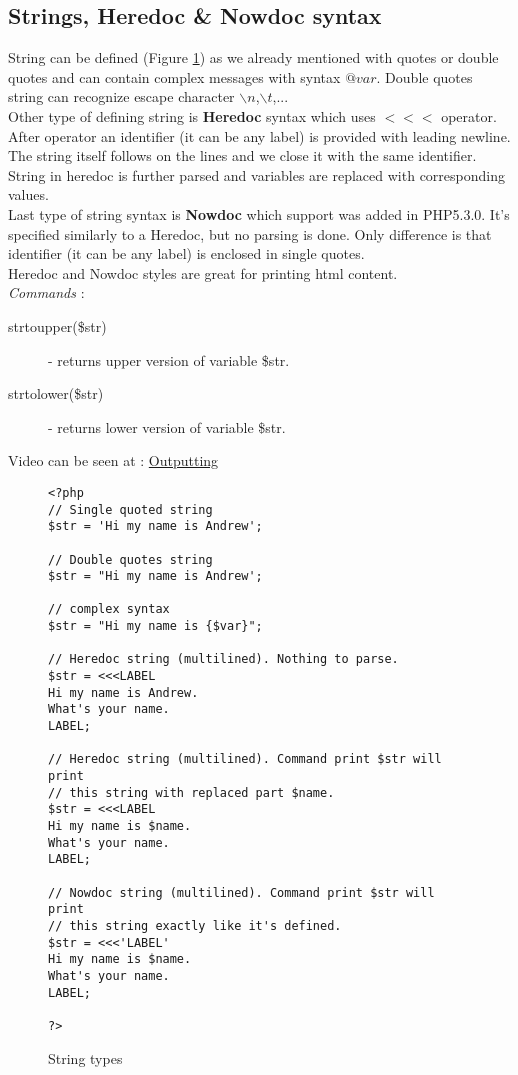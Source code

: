 \documentclass{article}
\begin{document}
\pagebreak
\subsection{Strings, Heredoc \& Nowdoc syntax}
String can be defined (Figure \hyperref[strings]{\ref{strings}}) as we already mentioned with quotes or double quotes and can contain complex messages with syntax ${@var}$. Double quotes string can recognize escape character $\backslash n$,$\backslash t$,... \\
Other type of defining string is \textbf{Heredoc} syntax which uses $<<<$ operator. After operator an identifier (it can be any label) is provided with leading newline. The string itself follows on the lines and we close it with the same identifier. String in heredoc is further parsed and variables are replaced with corresponding values.\\
Last type of string syntax is \textbf{Nowdoc} which support was added in PHP5.3.0. It's specified similarly to a Heredoc, but no parsing is done.
Only difference is that identifier (it can be any label) is enclosed in single quotes. \\
Heredoc and Nowdoc styles are great for printing html content. \\
\textit{Commands} :
\begin{description}
\item[\hspace{1cm} strtoupper(\$str)] - returns upper version of variable \$str.
\item[\hspace{1cm} strtolower(\$str)] - returns lower version of variable \$str.
\end{description}
Video can be seen at : \href{http://youtu.be/ZbRG9KQBbts}{Outputting}

\begin{figure}
\lstset{language=PHP}
\begin{lstlisting}[showstringspaces=false]
<?php
// Single quoted string
$str = 'Hi my name is Andrew';

// Double quotes string
$str = "Hi my name is Andrew';

// complex syntax
$str = "Hi my name is {$var}";

// Heredoc string (multilined). Nothing to parse.
$str = <<<LABEL
Hi my name is Andrew.
What's your name.
LABEL;

// Heredoc string (multilined). Command print $str will print
// this string with replaced part $name.
$str = <<<LABEL
Hi my name is $name.
What's your name.
LABEL;

// Nowdoc string (multilined). Command print $str will print
// this string exactly like it's defined.
$str = <<<'LABEL'
Hi my name is $name.
What's your name.
LABEL;

?>
\end{lstlisting}
\caption{String types \label{strings}}
\end{figure}
\pagebreak
\end{document}

